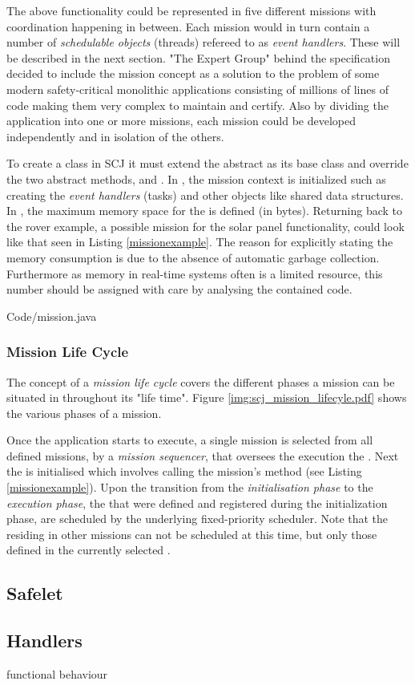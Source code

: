 The above functionality could be represented in five different missions with coordination happening in between. Each mission would in turn contain a number of \textit{schedulable objects} (threads) refereed to as \textit{event handlers}. These will be described in the next section. "The Expert Group" behind the specification decided to include the mission concept as a solution to the problem of some modern safety-critical monolithic applications consisting of millions of lines of code making them very complex to maintain and certify. Also by dividing the application into one or more missions, each mission could be developed independently and in isolation of the others.  

To create a  class in SCJ it must extend the abstract  as its base class and override the two abstract methods,  and . In , the mission context is initialized such as creating the \textit{event handlers} (tasks) and other objects like shared data structures. In , the maximum memory space for the  is defined (in bytes). Returning back to the rover example, a possible mission for the solar panel functionality, could look like that seen in Listing \ref{missionexample}. The reason for explicitly stating the memory consumption is due to the absence of automatic garbage collection. Furthermore as memory in real-time systems often is a limited resource, this number should be assigned with care by analysing the contained code.


{Code/mission.java}

\subsubsection{Mission Life Cycle}
The concept of a \textit{mission life cycle} covers the different phases a mission can be situated in throughout its "life time". Figure \ref{img:scj_mission_lifecyle.pdf} shows the various phases of a mission.


Once the application starts to execute, a single mission is selected from all defined missions, by a \textit{mission sequencer}, that oversees the execution the . Next the  is initialised which involves calling the mission's  method (see Listing \ref{missionexample}). Upon the transition from the \textit{initialisation phase} to the \textit{execution phase}, the  that were defined and registered during the initialization phase, are scheduled by the underlying fixed-priority scheduler. Note that the  residing in other missions can not be scheduled at this time, but only those defined in the currently selected .



\subsection{Safelet}

\subsection{Handlers}
functional behaviour